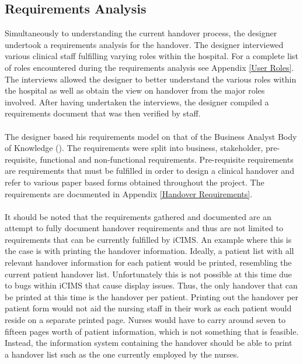 \subsection{Requirements Analysis}
Simultaneously to understanding the current handover process, the designer undertook a requirements analysis for the handover. The designer interviewed various clinical staff fulfilling varying roles within the hospital. For a complete list of roles encountered during the requirements analysis see Appendix \ref{User Roles}. The interviews allowed the designer to better understand the various roles within the hospital as well as obtain the view on handover from the major roles involved. After having undertaken the interviews, the designer compiled a requirements document that was then verified by staff. 
\\ \\ 
The designer based his requirements model on that of the Business Analyst Body of Knowledge (\cite{IIBA}). The requirements were split into business, stakeholder, pre-requisite, functional and non-functional requirements. Pre-requisite requirements are requirements that must be fulfilled in order to design a clinical handover and refer to various paper based forms obtained throughout the project.  The requirements are documented in Appendix \ref{Handover Requirements}.
\\ \\
It should be noted that the requirements gathered and documented are an attempt to fully document handover requirements and thus are not limited to requirements that can be currently fulfilled by iCIMS. An example where this is the case is with printing the handover information. Ideally, a patient list with all relevant handover information for each patient would be printed, resembling the current patient handover list. Unfortunately this is not possible at this time due to bugs within iCIMS that cause display issues. Thus, the only handover that can be printed at this time is the handover per patient. Printing out the handover per patient form would not aid the nursing staff in their work as each patient would reside on a separate printed page. Nurses would have to carry around seven to fifteen pages worth of patient information, which is not something that is feasible. Instead, the information system containing the handover should be able to print a handover list such as the one currently employed by the nurses.

